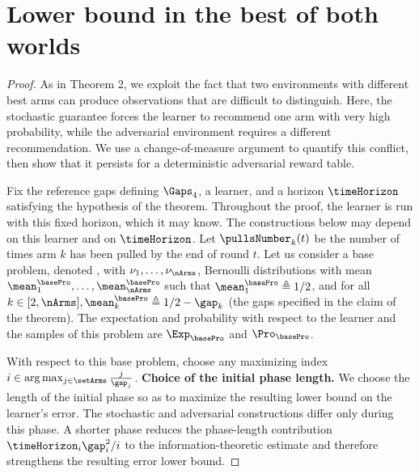 %

\section{Lower bound in the best of both worlds} %
\label{app:prooflowBOB}
%
\setcounter{scratchcounter}{\value{theorem}}
\thi*
\setcounter{theorem}{\the\numexpr\value{scratchcounter}}
\begin{proof}%
As in Theorem 2, we exploit the fact that two environments with different best
arms can produce observations that are difficult to distinguish. Here, the
stochastic guarantee forces the learner to recommend one arm with very high
probability, while the adversarial environment requires a different
recommendation. We use a change-of-measure argument to quantify this conflict,
then show that it persists for a deterministic adversarial reward table.

Fix the reference gaps defining $\Gaps_4$, a learner, and a
horizon $\timeHorizon$ satisfying the hypothesis of the theorem.
Throughout the proof, the learner is run with this fixed horizon,
which it may know. The constructions below may depend on this
learner and on $\timeHorizon$.
Let $\pullsNumber_k(t)$ be the number of times arm $k$ has been
pulled by the end of round $t$.
	Let us consider a base problem, denoted \basePro{}, with $\nu_1,\ldots, \nu_\nArms$, 
	Bernoulli distributions with mean $\mean^{\basePro}_1,
	\ldots, \mean^{\basePro}_\nArms$ 
	such that $\mean^{\basePro}_1 \triangleq 1/2$, and for all $k\in[2,\nArms], 
	\mean^{\basePro}_k \triangleq  1/2-\gap_k$ 
	(the gaps specified in the claim of the theorem).
	The expectation and probability with respect to the
	learner and the samples of this problem are 
	$\Exp_{\basePro}$ and $\Pro_{\basePro}$.%
	
	With respect to this base problem, choose any maximizing index $i\in\arg\max_{j\in\setArms}\frac{j}{\gap_j}$.
\noindent\textbf{Choice of the initial phase length.}
We choose the length of the initial phase so as to maximize the resulting
lower bound on the learner's error. The stochastic and adversarial
constructions differ only during this phase. A shorter phase reduces
the phase-length contribution $\timeHorizon_i\gap_i^2/i$ to the
information-theoretic estimate and therefore strengthens the resulting
error lower bound.


\end{proof}
